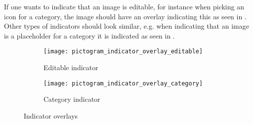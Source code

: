 If one wants to indicate that an image is editable, for instance when picking an icon for a category, the image should have an overlay indicating this as seen in . Other types of indicators should look similar, e.g. when indicating that an image is a placeholder for a category it is indicated as seen in .

\begin{figure}[!htbp]
    \centering

    \begin{subfigure}[t]{0.4\textwidth}
        \centering
        \texttt{[image: pictogram\_indicator\_overlay\_editable]}
        \caption{Editable indicator}
        \label{fig:pictogram_indicator_overlay_editable}
    \end{subfigure}
    \hspace{5em} 
    \begin{subfigure}[t]{0.4\textwidth}
        \centering
        \texttt{[image: pictogram\_indicator\_overlay\_category]}
        \caption{Category indicator}
        \label{fig:pictogram_indicator_overlay_category}
    \end{subfigure}
    
    \caption{Indicator overlays}
    \label{fig:pictograms_marked}
\end{figure}

